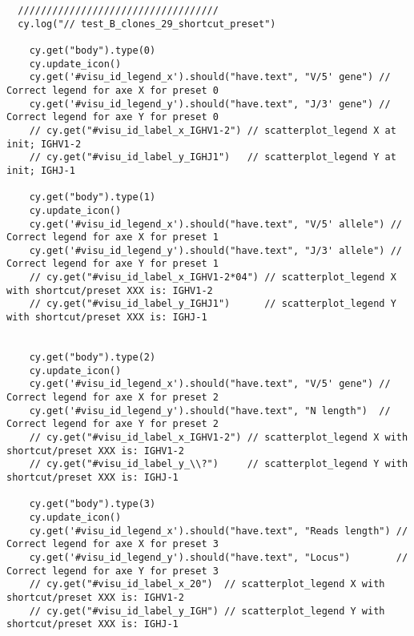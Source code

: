 
\begin{verbatim}
  ///////////////////////////////////
  cy.log("// test_B_clones_29_shortcut_preset")

    cy.get("body").type(0)
    cy.update_icon()
    cy.get('#visu_id_legend_x').should("have.text", "V/5' gene") // Correct legend for axe X for preset 0
    cy.get('#visu_id_legend_y').should("have.text", "J/3' gene") // Correct legend for axe Y for preset 0
    // cy.get("#visu_id_label_x_IGHV1-2") // scatterplot_legend X at init; IGHV1-2
    // cy.get("#visu_id_label_y_IGHJ1")   // scatterplot_legend Y at init; IGHJ-1

    cy.get("body").type(1)
    cy.update_icon()
    cy.get('#visu_id_legend_x').should("have.text", "V/5' allele") // Correct legend for axe X for preset 1
    cy.get('#visu_id_legend_y').should("have.text", "J/3' allele") // Correct legend for axe Y for preset 1
    // cy.get("#visu_id_label_x_IGHV1-2*04") // scatterplot_legend X with shortcut/preset XXX is: IGHV1-2
    // cy.get("#visu_id_label_y_IGHJ1")      // scatterplot_legend Y with shortcut/preset XXX is: IGHJ-1


    cy.get("body").type(2)
    cy.update_icon()
    cy.get('#visu_id_legend_x').should("have.text", "V/5' gene") // Correct legend for axe X for preset 2
    cy.get('#visu_id_legend_y').should("have.text", "N length")  // Correct legend for axe Y for preset 2
    // cy.get("#visu_id_label_x_IGHV1-2") // scatterplot_legend X with shortcut/preset XXX is: IGHV1-2
    // cy.get("#visu_id_label_y_\\?")     // scatterplot_legend Y with shortcut/preset XXX is: IGHJ-1

    cy.get("body").type(3)
    cy.update_icon()
    cy.get('#visu_id_legend_x').should("have.text", "Reads length") // Correct legend for axe X for preset 3
    cy.get('#visu_id_legend_y').should("have.text", "Locus")        // Correct legend for axe Y for preset 3
    // cy.get("#visu_id_label_x_20")  // scatterplot_legend X with shortcut/preset XXX is: IGHV1-2
    // cy.get("#visu_id_label_y_IGH") // scatterplot_legend Y with shortcut/preset XXX is: IGHJ-1


\end{verbatim}
